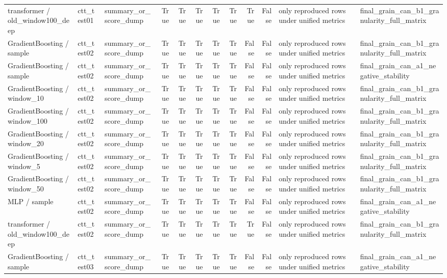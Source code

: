 \begin{tabular}{lllrrrrrrrll}
transformer / old\_window100\_deep & ctt\_test01 & summary\_or\_score\_dump & True & True & True & True & True & True & False & only reproduced rows under unified metrics & final\_grain\_can\_b1\_granularity\_full\_matrix \\
GradientBoosting / sample & ctt\_test02 & summary\_or\_score\_dump & True & True & True & True & True & False & False & only reproduced rows under unified metrics & final\_grain\_can\_b1\_granularity\_full\_matrix \\
GradientBoosting / sample & ctt\_test02 & summary\_or\_score\_dump & True & True & True & True & True & False & False & only reproduced rows under unified metrics & final\_grain\_can\_a1\_negative\_stability \\
GradientBoosting / window\_10 & ctt\_test02 & summary\_or\_score\_dump & True & True & True & True & True & False & False & only reproduced rows under unified metrics & final\_grain\_can\_b1\_granularity\_full\_matrix \\
GradientBoosting / window\_100 & ctt\_test02 & summary\_or\_score\_dump & True & True & True & True & True & False & False & only reproduced rows under unified metrics & final\_grain\_can\_b1\_granularity\_full\_matrix \\
GradientBoosting / window\_20 & ctt\_test02 & summary\_or\_score\_dump & True & True & True & True & True & False & False & only reproduced rows under unified metrics & final\_grain\_can\_b1\_granularity\_full\_matrix \\
GradientBoosting / window\_5 & ctt\_test02 & summary\_or\_score\_dump & True & True & True & True & True & False & False & only reproduced rows under unified metrics & final\_grain\_can\_b1\_granularity\_full\_matrix \\
GradientBoosting / window\_50 & ctt\_test02 & summary\_or\_score\_dump & True & True & True & True & True & False & False & only reproduced rows under unified metrics & final\_grain\_can\_b1\_granularity\_full\_matrix \\
MLP / sample & ctt\_test02 & summary\_or\_score\_dump & True & True & True & True & True & False & False & only reproduced rows under unified metrics & final\_grain\_can\_a1\_negative\_stability \\
transformer / old\_window100\_deep & ctt\_test02 & summary\_or\_score\_dump & True & True & True & True & True & True & False & only reproduced rows under unified metrics & final\_grain\_can\_b1\_granularity\_full\_matrix \\
GradientBoosting / sample & ctt\_test03 & summary\_or\_score\_dump & True & True & True & True & True & False & False & only reproduced rows under unified metrics & final\_grain\_can\_a1\_negative\_stability \\

\end{tabular}
